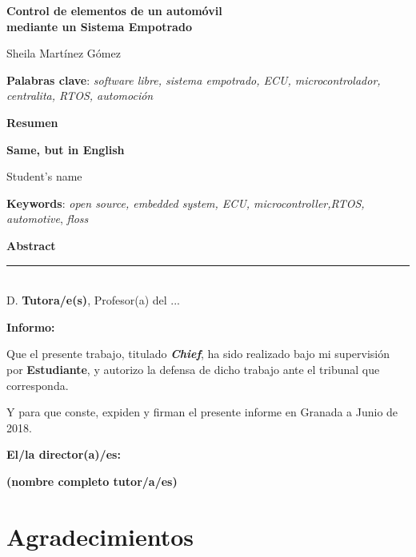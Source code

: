 \thispagestyle{empty}

\begin{center}
{\large\bfseries Control de elementos de un automóvil \\ mediante un Sistema Empotrado }\\
\end{center}
\begin{center}
Sheila Martínez Gómez\\
\end{center}


\vspace{0.5cm}
\noindent\textbf{Palabras clave}: \textit{software libre, sistema empotrado, ECU, microcontrolador, centralita, RTOS, automoción}
\vspace{0.7cm}

\noindent\textbf{Resumen}\\
	

\cleardoublepage

\begin{center}
	{\large\bfseries Same, but in English}\\
\end{center}
\begin{center}
	Student's name\\
\end{center}
\vspace{0.5cm}
\noindent\textbf{Keywords}: \textit{open source, embedded system, ECU, microcontroller,RTOS, automotive}, \textit{floss}
\vspace{0.7cm}

\noindent\textbf{Abstract}\\


\cleardoublepage

\thispagestyle{empty}

\noindent\rule[-1ex]{\textwidth}{2pt}\\[4.5ex]

D. \textbf{Tutora/e(s)}, Profesor(a) del ...

\vspace{0.5cm}

\textbf{Informo:}

\vspace{0.5cm}

Que el presente trabajo, titulado \textit{\textbf{Chief}},
ha sido realizado bajo mi supervisión por \textbf{Estudiante}, y autorizo la defensa de dicho trabajo ante el tribunal
que corresponda.

\vspace{0.5cm}

Y para que conste, expiden y firman el presente informe en Granada a Junio de 2018.

\vspace{1cm}

\textbf{El/la director(a)/es: }

\vspace{5cm}

\noindent \textbf{(nombre completo tutor/a/es)}

\chapter*{Agradecimientos}




